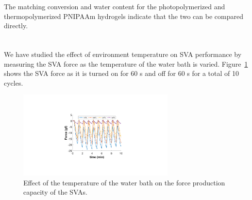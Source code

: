 The matching conversion and water content for the photopolymerized and thermopolymerized PNIPAAm hydrogels indicate that the two can be compared directly.

\section{}
We have studied the effect of environment temperature on SVA performance by measuring the SVA force as the temperature of the water bath is varied. Figure~\ref{fig:envTemp} shows the SVA force as it is turned on for 60 s and off for 60 s for a total of 10 cycles.
\begin{figure}[!ht]
      \centering
      \includegraphics[width=0.7\textwidth]{envTemp.pdf}
      \caption[]{Effect of the temperature of the water bath on the force production capacity of the SVAs.}
      \label{fig:envTemp}
\end{figure}

